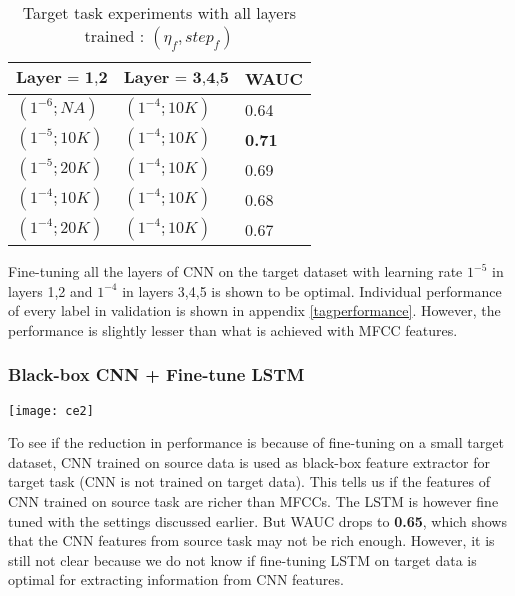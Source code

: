 \begin{table}[!htb]
\centering
\begin{tabular}{| p{} | p{}| p{}| }
\hline
$\textbf{Layer = 1,2}$ & $\textbf{Layer = 3,4,5}$ & \textbf{WAUC}\\
\hline
$(1^{-6}; NA)$ & $(1^{-4}; 10K)$ & 0.64\\
\hline
$(1^{-5}; 10K)$ & $(1^{-4}; 10K)$ & \textbf{0.71}\\
\hline
$(1^{-5}; 20K)$ & $(1^{-4}; 10K)$ & 0.69\\
\hline
$(1^{-4}; 10K)$ & $(1^{-4}; 10K)$ & 0.68\\
\hline
$(1^{-4}; 20K)$ & $(1^{-4}; 10K)$ & 0.67\\
\hline
\end{tabular}
\caption{Target task experiments with all layers trained : $(\eta_{f}, {step}_{f})$}\label{tab:a8}
\end{table}
\FloatBarrier
\noindent Fine-tuning all the layers of CNN on the target dataset with learning rate $1^{-5}$ in layers 1,2 and $1^{-4}$ in layers 3,4,5 is shown to be optimal. Individual performance of every label in validation is shown in appendix \ref{tagperformance}. However, the performance is slightly lesser than what is achieved with MFCC features.

\subsubsection{Black-box CNN + Fine-tune LSTM}  
\begin{minipage}{0.15\textwidth}
\texttt{[image: ce2]}
\end{minipage}
\begin{minipage}{0.80\textwidth}
To see if the reduction in performance is because of fine-tuning on a small target dataset, CNN trained on source data is used as black-box feature extractor for target task (CNN is not trained on target data). This tells us if the features of CNN trained on source task are richer than MFCCs. The LSTM is however fine tuned with the settings discussed earlier. But WAUC drops to \textbf{0.65}, which shows that the CNN features from source task may not be rich enough. However, it is still not clear because we do not know if fine-tuning LSTM on target data is optimal for extracting information from CNN features. 
\end{minipage}

